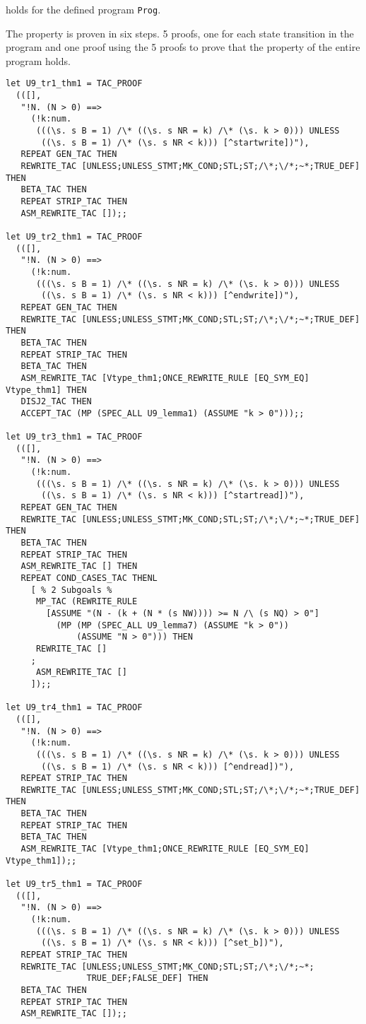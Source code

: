 holds for the defined program {\tt Prog}.

The property is proven in six steps. 5 proofs, one for each state transition in
the program and one proof using the 5 proofs to prove that the property of the
entire program holds.

{\footnotesize 
\begin{verbatim}
let U9_tr1_thm1 = TAC_PROOF
  (([],
   "!N. (N > 0) ==>
     (!k:num.
      (((\s. s B = 1) /\* ((\s. s NR = k) /\* (\s. k > 0))) UNLESS
       ((\s. s B = 1) /\* (\s. s NR < k))) [^startwrite])"),
   REPEAT GEN_TAC THEN
   REWRITE_TAC [UNLESS;UNLESS_STMT;MK_COND;STL;ST;/\*;\/*;~*;TRUE_DEF] THEN
   BETA_TAC THEN
   REPEAT STRIP_TAC THEN
   ASM_REWRITE_TAC []);;

let U9_tr2_thm1 = TAC_PROOF
  (([],
   "!N. (N > 0) ==>
     (!k:num.
      (((\s. s B = 1) /\* ((\s. s NR = k) /\* (\s. k > 0))) UNLESS
       ((\s. s B = 1) /\* (\s. s NR < k))) [^endwrite])"),
   REPEAT GEN_TAC THEN
   REWRITE_TAC [UNLESS;UNLESS_STMT;MK_COND;STL;ST;/\*;\/*;~*;TRUE_DEF] THEN
   BETA_TAC THEN
   REPEAT STRIP_TAC THEN
   BETA_TAC THEN
   ASM_REWRITE_TAC [Vtype_thm1;ONCE_REWRITE_RULE [EQ_SYM_EQ] Vtype_thm1] THEN
   DISJ2_TAC THEN
   ACCEPT_TAC (MP (SPEC_ALL U9_lemma1) (ASSUME "k > 0")));;

let U9_tr3_thm1 = TAC_PROOF
  (([],
   "!N. (N > 0) ==>
     (!k:num.
      (((\s. s B = 1) /\* ((\s. s NR = k) /\* (\s. k > 0))) UNLESS
       ((\s. s B = 1) /\* (\s. s NR < k))) [^startread])"),
   REPEAT GEN_TAC THEN
   REWRITE_TAC [UNLESS;UNLESS_STMT;MK_COND;STL;ST;/\*;\/*;~*;TRUE_DEF] THEN
   BETA_TAC THEN
   REPEAT STRIP_TAC THEN
   ASM_REWRITE_TAC [] THEN
   REPEAT COND_CASES_TAC THENL
     [ % 2 Subgoals %
      MP_TAC (REWRITE_RULE
        [ASSUME "(N - (k + (N * (s NW)))) >= N /\ (s NQ) > 0"]
          (MP (MP (SPEC_ALL U9_lemma7) (ASSUME "k > 0")) 
              (ASSUME "N > 0"))) THEN
      REWRITE_TAC []
     ;
      ASM_REWRITE_TAC []
     ]);;

let U9_tr4_thm1 = TAC_PROOF
  (([],
   "!N. (N > 0) ==>
     (!k:num.
      (((\s. s B = 1) /\* ((\s. s NR = k) /\* (\s. k > 0))) UNLESS
       ((\s. s B = 1) /\* (\s. s NR < k))) [^endread])"),
   REPEAT STRIP_TAC THEN
   REWRITE_TAC [UNLESS;UNLESS_STMT;MK_COND;STL;ST;/\*;\/*;~*;TRUE_DEF] THEN
   BETA_TAC THEN
   REPEAT STRIP_TAC THEN
   BETA_TAC THEN
   ASM_REWRITE_TAC [Vtype_thm1;ONCE_REWRITE_RULE [EQ_SYM_EQ] Vtype_thm1]);;

let U9_tr5_thm1 = TAC_PROOF
  (([],
   "!N. (N > 0) ==>
     (!k:num.
      (((\s. s B = 1) /\* ((\s. s NR = k) /\* (\s. k > 0))) UNLESS
       ((\s. s B = 1) /\* (\s. s NR < k))) [^set_b])"),
   REPEAT STRIP_TAC THEN
   REWRITE_TAC [UNLESS;UNLESS_STMT;MK_COND;STL;ST;/\*;\/*;~*;
                TRUE_DEF;FALSE_DEF] THEN
   BETA_TAC THEN
   REPEAT STRIP_TAC THEN
   ASM_REWRITE_TAC []);;
\end{verbatim}
}

